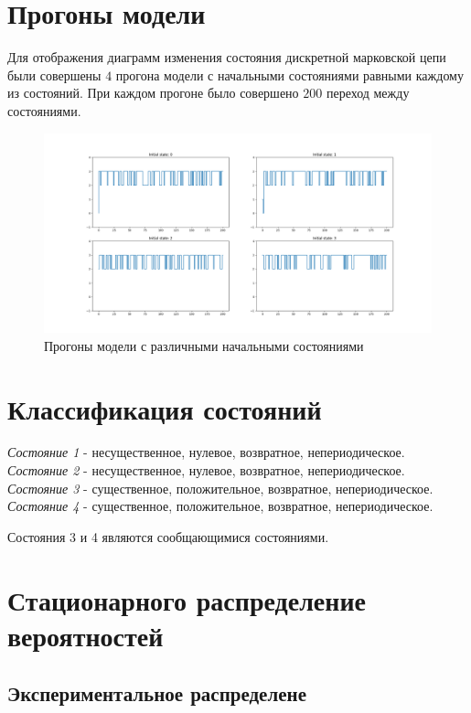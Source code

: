\section{Прогоны модели}

Для отображения диаграмм изменения состояния дискретной марковской цепи были совершены $4$ прогона модели
с начальными состояниями равными каждому из состояний. При каждом прогоне было совершено $200$ переход между
состояниями.

\begin{figure}[h!]
    \centering
    \includegraphics[width=\textwidth]{img/initial_runs.png}
    \caption{Прогоны модели с различными начальными состояниями}
\end{figure}

\section{Классификация состояний}

\textit{Состояние 1} - несущественное, нулевое, возвратное, непериодическое.
\textit{Состояние 2} - несущественное, нулевое, возвратное, непериодическое.
\textit{Состояние 3} - существенное, положительное, возвратное, непериодическое.
\textit{Состояние 4} - существенное, положительное, возвратное, непериодическое.

Состояния 3 и 4 являются сообщающимися состояниями.

\section{Стационарного распределение вероятностей}

\subsection{Экспериментальное распределене}

